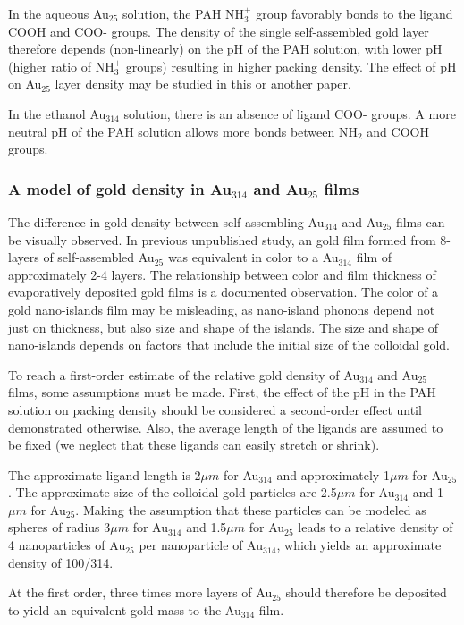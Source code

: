 \documentclass[12pt,oneside,english]{article}
\begin{document}
	In the aqueous Au$_{25}$ solution, the PAH NH$_3^+$ group favorably bonds to the ligand COOH and COO- groups.  The density of the single self-assembled gold layer therefore depends (non-linearly) on the pH of the PAH solution, with lower pH (higher ratio of NH$_3^+$ groups) resulting in higher packing density.  The effect of pH on Au$_{25}$ layer density may be studied in this or another paper.
	
	In the ethanol Au$_{314}$ solution, there is an absence of ligand COO- groups.  A more neutral pH of the PAH solution allows more bonds between NH$_2$ and COOH groups.
	
	\subsubsection{A model of gold density in Au$_{314}$ and Au$_{25}$ films}
	The difference in gold density between self-assembling Au$_{314}$ and Au$_{25}$ films can be visually observed.  In previous unpublished study, an gold film formed from 8-layers of self-assembled Au$_{25}$ was equivalent in color to a Au$_{314}$ film of approximately 2-4 layers.  The relationship between color and film thickness of evaporatively deposited gold films is a documented observation.  The color of a gold nano-islands film may be misleading, as nano-island phonons depend not just on thickness, but also size and shape of the islands.  The size and shape of nano-islands depends on factors that include the initial size of the colloidal gold.
	
	To reach a first-order estimate of the relative gold density of Au$_{314}$ and Au$_{25}$ films, some assumptions must be made.  First, the effect of the pH in the PAH solution on packing density should be considered a second-order effect until demonstrated otherwise.  Also, the average length of the ligands are assumed to be fixed (we neglect that these ligands can easily stretch or shrink).
	
	The approximate ligand length is 2${\mu}m$ for Au$_{314}$ and approximately 1${\mu}m$ for Au$_{25}$.  The approximate size of the colloidal gold particles are 2.5${\mu}m$ for Au$_{314}$ and 1${\mu}m$ for Au$_{25}$.  Making the assumption that these particles can be modeled as spheres of radius 3${\mu}m$ for Au$_{314}$ and 1.5${\mu}m$ for Au$_{25}$ leads to a relative density of 4 nanoparticles of Au$_{25}$ per nanoparticle of Au$_{314}$, which yields an approximate density of 100/314.
	
	At the first order, three times more layers of Au$_{25}$ should therefore be deposited to yield an equivalent gold mass to the Au$_{314}$ film.
	
\end{document}
